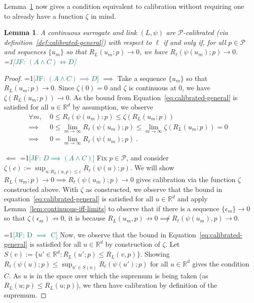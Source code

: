 \documentclass[11pt]{article} %
\newcommand{\Comments}{1}
\newcommand{\mynote}[2]{\ifnum\Comments=1\textcolor{#1}{#2}\fi}
\newcommand{\jessie}[1]{\mynote{teal}{[JF: #1]}}
\newcommand{\reals}{\mathbb{R}}
\renewcommand{\P}{\mathcal{P}}
\newtheorem{lemma}{Lemma}
\begin{document}
Lemma~\ref{lem:calib-converging-regrets} now gives a condition equivalent to calibration without requiring one to already have a function $\zeta$ in mind.
\begin{lemma}\label{lem:calib-converging-regrets}
	A continuous surrogate and link $(L,\psi)$ are $\P$-calibrated (via definition~\ref{def:calibrated-general}) with respect to $\ell$ if and only if, for all $p \in \P$ and sequences $\{u_m\}$ so that $R_L(u_m; p) \to 0$, we have $R_\ell(\psi(u_m); p) \to 0$.
	\jessie{$(A \wedge C) \iff D$}
\end{lemma}
\begin{proof}
\jessie{$(A \wedge C) \implies D$}
	$\implies$ Take a sequence $\{u_m\}$ so that $R_L(u_m;p) \to 0$.
	Since $\zeta(0) = 0$ and $\zeta$ is continuous at $0$, we have $\zeta(R_L(u_m;p)) \to 0$.
	As the bound from Equation~\eqref{eq:calibrated-general} is satisfied for all $u \in \reals^d$ by assumption, we observe
	\begin{align*}
	\forall m, \; &0 \leq R_\ell(\psi(u_m); p) \leq \zeta(R_L(u_m;p))\\
	\implies &0 \leq \lim_{m \to \infty} R_\ell(\psi(u_m); p) \leq \lim_{m \to \infty} \zeta(R_L(u_m;p)) = 0\\
	\implies &0 = \lim_{m\to\infty} R_\ell(\psi(u_m); p) ~.~
	\end{align*}
	
	
	$\impliedby$ 
\jessie{$D \implies (A \wedge C)$}
	Fix $p \in \P$, and consider $\zeta(c) := \sup_{u: R_L(u,p) \leq c} R_\ell(\psi(u); p)$.  
	We will show $R_L(u_m; p) \to 0 \implies R_\ell(\psi(u_m); p) \to 0$ gives calibration via the function $\zeta$ constructed above. 
	With $\zeta$ as constructed, we observe that the bound in equation~\eqref{eq:calibrated-general} is satisfied for all $u \in \reals^d$ and apply Lemma~\ref{lem:continuous-iff-limits} to observe that if there is a sequence $\{\epsilon_m\} \to 0$ so that $\zeta(\epsilon_m) \not \to 0$, it is because $R_L(u_m, p) \not \to 0 \not\implies R_\ell(\psi(u_m), p) \to 0$.
	

\jessie{D $\implies$ C}
Now, we observe that the bound in Equation~\eqref{eq:calibrated-general} is satisfied for all $u \in \reals^d$ by construction of $\zeta$.
Let $S(v) := \{u' \in \reals^d : R_L(u';p) \leq R_L(v,p) \}$.
Showing $R_\ell(\psi(u);p) \leq \sup_{u' \in S(u)} R_\ell(\psi(u') ; p)$ for all $u \in \reals^d$ gives the condition $C$.
As $u$ is in the space over which the supremum is being taken (as $R_L(u;p) \leq R_L(u;p)$), we then have calibration by definition of the supremum.


\end{proof}
\end{document}
